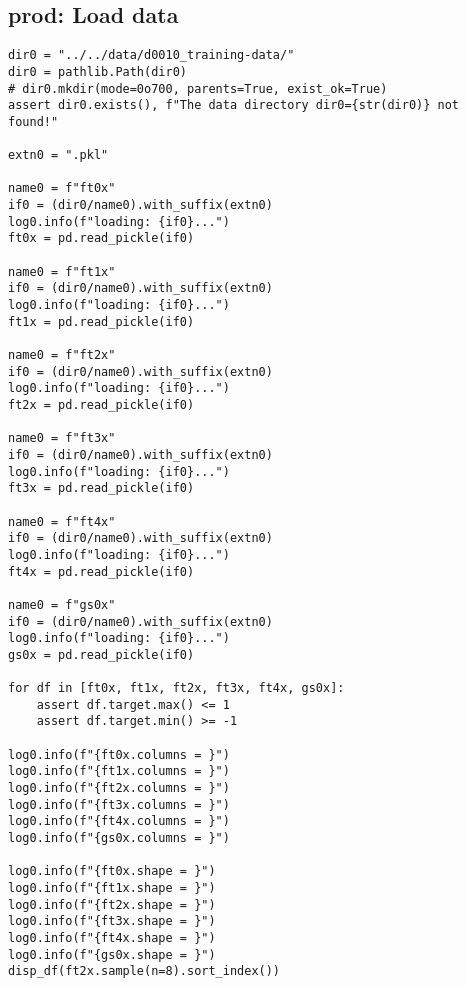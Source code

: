 \documentclass[a4paper,10pt,onecolumn,oneside,openright]{article}
\begin{document}
\subsection{prod: Load data}
\label{sec:orga49a3d8}
\begin{verbatim}
dir0 = "../../data/d0010_training-data/"
dir0 = pathlib.Path(dir0)
# dir0.mkdir(mode=0o700, parents=True, exist_ok=True)
assert dir0.exists(), f"The data directory dir0={str(dir0)} not found!"

extn0 = ".pkl"

name0 = f"ft0x"
if0 = (dir0/name0).with_suffix(extn0)
log0.info(f"loading: {if0}...")
ft0x = pd.read_pickle(if0)

name0 = f"ft1x"
if0 = (dir0/name0).with_suffix(extn0)
log0.info(f"loading: {if0}...")
ft1x = pd.read_pickle(if0)

name0 = f"ft2x"
if0 = (dir0/name0).with_suffix(extn0)
log0.info(f"loading: {if0}...")
ft2x = pd.read_pickle(if0)

name0 = f"ft3x"
if0 = (dir0/name0).with_suffix(extn0)
log0.info(f"loading: {if0}...")
ft3x = pd.read_pickle(if0)

name0 = f"ft4x"
if0 = (dir0/name0).with_suffix(extn0)
log0.info(f"loading: {if0}...")
ft4x = pd.read_pickle(if0)

name0 = f"gs0x"
if0 = (dir0/name0).with_suffix(extn0)
log0.info(f"loading: {if0}...")
gs0x = pd.read_pickle(if0)

for df in [ft0x, ft1x, ft2x, ft3x, ft4x, gs0x]:
    assert df.target.max() <= 1
    assert df.target.min() >= -1

log0.info(f"{ft0x.columns = }")
log0.info(f"{ft1x.columns = }")
log0.info(f"{ft2x.columns = }")
log0.info(f"{ft3x.columns = }")
log0.info(f"{ft4x.columns = }")
log0.info(f"{gs0x.columns = }")

log0.info(f"{ft0x.shape = }")
log0.info(f"{ft1x.shape = }")
log0.info(f"{ft2x.shape = }")
log0.info(f"{ft3x.shape = }")
log0.info(f"{ft4x.shape = }")
log0.info(f"{gs0x.shape = }")
disp_df(ft2x.sample(n=8).sort_index())
\end{verbatim}
\end{document}
